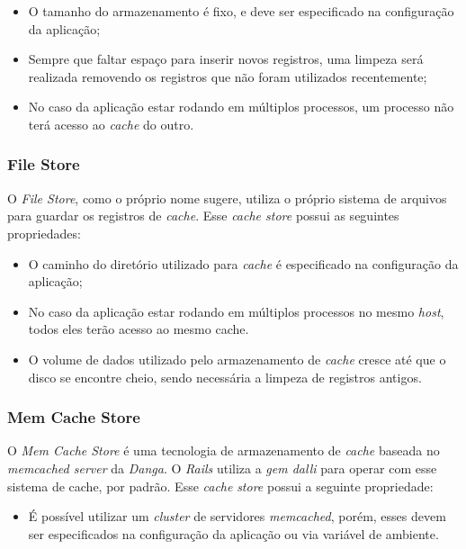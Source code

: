 \begin{itemize}
    \item O tamanho do armazenamento é fixo, e deve ser especificado na configuração da aplicação;
    \item Sempre que faltar espaço para inserir novos registros, uma limpeza será realizada removendo os registros que não foram utilizados recentemente;
    \item No caso da aplicação estar rodando em múltiplos processos, um processo não terá acesso ao \textit{cache} do outro.
\end{itemize}

\subsubsection{File Store}

O \textit{File Store}, como o próprio nome sugere, utiliza o próprio sistema de arquivos para guardar os registros de \textit{cache}. Esse \textit{cache store} possui as seguintes propriedades:

\begin{itemize}
    \item O caminho do diretório utilizado para \textit{cache} é especificado na configuração da aplicação;
    \item No caso da aplicação estar rodando em múltiplos processos no mesmo \textit{host}, todos eles terão acesso ao mesmo cache.
    \item O volume de dados utilizado pelo armazenamento de \textit{cache} cresce até que o disco se encontre cheio, sendo necessária a limpeza de registros antigos.
\end{itemize}

\subsubsection{Mem Cache Store}

O \textit{Mem Cache Store} é uma tecnologia de armazenamento de \textit{cache} baseada no \textit{memcached server} da \textit{Danga}. O \textit{Rails} utiliza a \textit{gem dalli} para operar com esse sistema de cache, por padrão. Esse \textit{cache} \textit{store} possui a seguinte propriedade:

\begin{itemize}
    \item É possível utilizar um \textit{cluster} de servidores \textit{memcached}, porém, esses devem ser especificados na configuração da aplicação ou via variável de ambiente.
\end{itemize}

